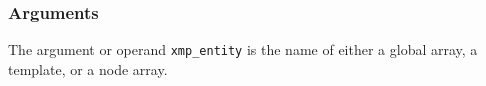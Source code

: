 \subsubsection*{Arguments}

The argument or operand {\tt xmp\_entity} is the name of either a global
array, a template, or a node array.

%
%
%
%
%
%
%
%
%
%
%
%
%
